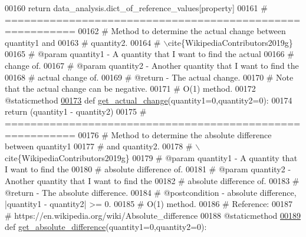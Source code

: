 \begin{DoxyCode}
{00160         \textcolor{keywordflow}{return} data\_analysis.dict\_of\_reference\_values[property]
00161     \textcolor{comment}{# =========================================================}
00162     \textcolor{comment}{#   Method to determine the actual change between quantity1 and}
00163     \textcolor{comment}{#       quantity2.}
00164     \textcolor{comment}{#   \(\backslash\)cite\{WikipediaContributors2019g\}}
00165     \textcolor{comment}{#   @param quantity1 - A quantity that I want to find the actual}
00166     \textcolor{comment}{#       change of.}
00167     \textcolor{comment}{#   @param quantity2 - Another quantity that I want to find the}
00168     \textcolor{comment}{#       actual change of.}
00169     \textcolor{comment}{#   @return - The actual change.}
00170     \textcolor{comment}{#   Note that the actual change can be negative.}
00171     \textcolor{comment}{#   O(1) method.}
00172     @staticmethod
\hypertarget{data__analysis__tool_8py_source_l00173}{}\hyperlink{classstatistics_1_1data__analysis__tool_1_1data__analysis_a2559796fe2b8c7a1619e741345ff2f8d}{00173}     \textcolor{keyword}{def }\hyperlink{classstatistics_1_1data__analysis__tool_1_1data__analysis_a2559796fe2b8c7a1619e741345ff2f8d}{get\_actual\_change}(quantity1=0,quantity2=0):
00174         \textcolor{keywordflow}{return} (quantity1 - quantity2)
00175     \textcolor{comment}{# =========================================================}
00176     \textcolor{comment}{#   Method to determine the absolute difference between quantity1}
00177     \textcolor{comment}{#       and quantity2.}
00178     \textcolor{comment}{#   \(\backslash\)cite\{WikipediaContributors2019g\}}
00179     \textcolor{comment}{#   @param quantity1 - A quantity that I want to find the}
00180     \textcolor{comment}{#       absolute difference of.}
00181     \textcolor{comment}{#   @param quantity2 - Another quantity that I want to find the}
00182     \textcolor{comment}{#       absolute difference of.}
00183     \textcolor{comment}{#   @return - The absolute difference.}
00184     \textcolor{comment}{#   @postcondition - absolute difference, |quantity1 - quantity2| >= 0.}
00185     \textcolor{comment}{#   O(1) method.}
00186     \textcolor{comment}{#   Reference:}
00187     \textcolor{comment}{#       https://en.wikipedia.org/wiki/Absolute\_difference}
00188     @staticmethod
\hypertarget{data__analysis__tool_8py_source_l00189}{}\hyperlink{classstatistics_1_1data__analysis__tool_1_1data__analysis_a4443b2fd70b1f2632cc3e003915af2f3}{00189}     \textcolor{keyword}{def }\hyperlink{classstatistics_1_1data__analysis__tool_1_1data__analysis_a4443b2fd70b1f2632cc3e003915af2f3}{get\_absolute\_difference}(quantity1=0,quantity2=0):
}
\end{DoxyCode}

